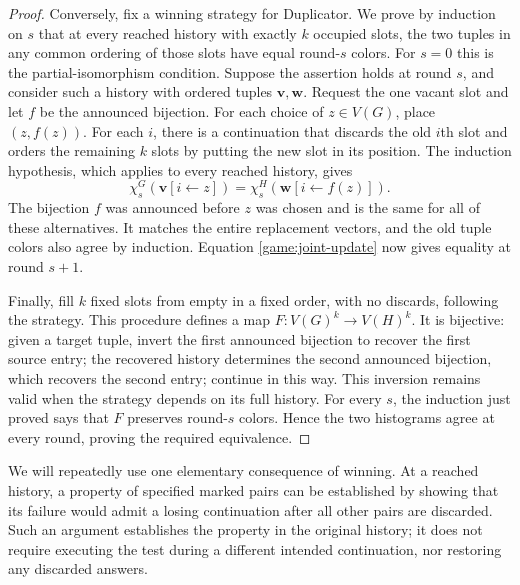 \begin{proof}
Conversely, fix a winning strategy for Duplicator.  We prove by induction
on $s$ that at every reached history with exactly $k$ occupied slots, the
two tuples in any common ordering of those slots have equal round-$s$
colors.  For $s=0$ this is the partial-isomorphism condition.  Suppose the
assertion holds at round $s$, and consider such a history with ordered
tuples $\mathbf v,\mathbf w$.  Request the one vacant slot and let $f$ be
the announced bijection.  For each choice of $z\in V(G)$, place
$(z,f(z))$.  For each $i$, there is a continuation that discards the old
$i$th slot and orders the remaining $k$ slots by putting the new slot in
its position.  The induction hypothesis, which applies to every reached
history, gives
\[
 \chi_s^G(\mathbf v[i\leftarrow z])
 =\chi_s^H(\mathbf w[i\leftarrow f(z)]).
\]
The bijection $f$ was announced before $z$ was chosen and is the same for
all of these alternatives.  It matches the entire replacement vectors,
and the old tuple colors also agree by induction.  Equation
\eqref{game:joint-update} now gives equality at round $s+1$.

Finally, fill $k$ fixed slots from empty in a fixed order, with no
discards, following the strategy.  This procedure defines a map
$F:V(G)^k\to V(H)^k$.  It is bijective: given a target tuple, invert the
first announced bijection to recover the first source entry; the recovered
history determines the second announced bijection, which recovers the
second entry; continue in this way.  This inversion remains valid when
the strategy depends on its full history.  For every $s$, the induction
just proved says that $F$ preserves round-$s$ colors.  Hence the two
histograms agree at every round, proving the required equivalence.
\end{proof}

We will repeatedly use one elementary consequence of winning.  At a
reached history, a property of specified marked pairs can be established
by showing that its failure would admit a losing continuation after all
other pairs are discarded.  Such an argument establishes the property
in the original history; it does not require executing the test during a
different intended continuation, nor restoring any discarded answers.
